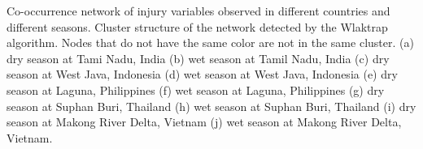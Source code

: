 Co-occurrence network of injury variables observed in different countries and different seasons. Cluster structure of the network detected by the Wlaktrap algorithm. Nodes that do not have the same color are not in the same cluster. (a) dry season at Tami Nadu, India (b)  wet season at Tamil Nadu, India (c) dry season at West Java, Indonesia (d) wet season at West Java, Indonesia (e) dry season at Laguna, Philippines (f) wet season at Laguna, Philippines (g) dry season at Suphan Buri, Thailand (h) wet season at Suphan Buri, Thailand (i) dry season at Makong River Delta, Vietnam (j) wet season at Makong River Delta, Vietnam.